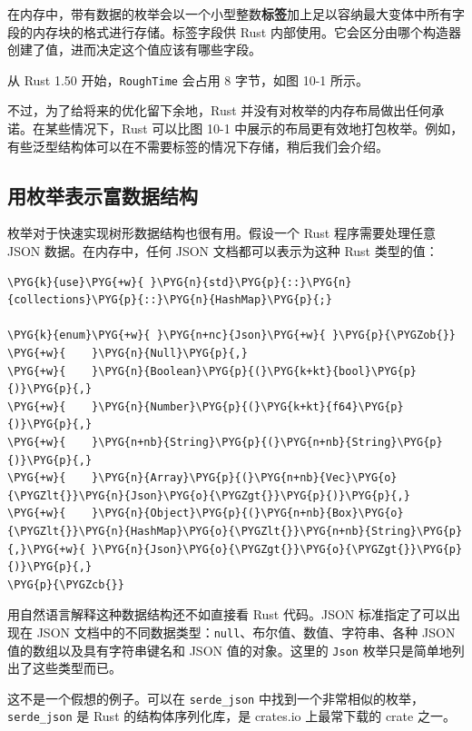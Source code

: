在内存中，带有数据的枚举会以一个小型整数\textbf{标签}加上足以容纳最大变体中所有字段的内存块的格式进行存储。标签字段供 Rust 内部使用。它会区分由哪个构造器创建了值，进而决定这个值应该有哪些字段。

从 Rust 1.50 开始，\texttt{RoughTime} 会占用 8 字节，如图 10-1 所示。


不过，为了给将来的优化留下余地，Rust 并没有对枚举的内存布局做出任何承诺。在某些情况下，Rust 可以比图 10-1 中展示的布局更有效地打包枚举。例如，有些泛型结构体可以在不需要标签的情况下存储，稍后我们会介绍。

\subsection{用枚举表示富数据结构}

枚举对于快速实现树形数据结构也很有用。假设一个 Rust 程序需要处理任意 JSON 数据。在内存中，任何 JSON 文档都可以表示为这种 Rust 类型的值：

\begin{Verbatim}[commandchars=\\\{\},breaklines=true,breakanywhere=true,fontsize=\codefont,xleftmargin=17bp]
\PYG{k}{use}\PYG{+w}{ }\PYG{n}{std}\PYG{p}{::}\PYG{n}{collections}\PYG{p}{::}\PYG{n}{HashMap}\PYG{p}{;}

\PYG{k}{enum}\PYG{+w}{ }\PYG{n+nc}{Json}\PYG{+w}{ }\PYG{p}{\PYGZob{}}
\PYG{+w}{    }\PYG{n}{Null}\PYG{p}{,}
\PYG{+w}{    }\PYG{n}{Boolean}\PYG{p}{(}\PYG{k+kt}{bool}\PYG{p}{)}\PYG{p}{,}
\PYG{+w}{    }\PYG{n}{Number}\PYG{p}{(}\PYG{k+kt}{f64}\PYG{p}{)}\PYG{p}{,}
\PYG{+w}{    }\PYG{n+nb}{String}\PYG{p}{(}\PYG{n+nb}{String}\PYG{p}{)}\PYG{p}{,}
\PYG{+w}{    }\PYG{n}{Array}\PYG{p}{(}\PYG{n+nb}{Vec}\PYG{o}{\PYGZlt{}}\PYG{n}{Json}\PYG{o}{\PYGZgt{}}\PYG{p}{)}\PYG{p}{,}
\PYG{+w}{    }\PYG{n}{Object}\PYG{p}{(}\PYG{n+nb}{Box}\PYG{o}{\PYGZlt{}}\PYG{n}{HashMap}\PYG{o}{\PYGZlt{}}\PYG{n+nb}{String}\PYG{p}{,}\PYG{+w}{ }\PYG{n}{Json}\PYG{o}{\PYGZgt{}}\PYG{o}{\PYGZgt{}}\PYG{p}{)}\PYG{p}{,}
\PYG{p}{\PYGZcb{}}
\end{Verbatim}

用自然语言解释这种数据结构还不如直接看 Rust 代码。JSON 标准指定了可以出现在 JSON 文档中的不同数据类型：\texttt{null}、布尔值、数值、字符串、各种 JSON 值的数组以及具有字符串键名和 JSON 值的对象。这里的 \texttt{Json} 枚举只是简单地列出了这些类型而已。

这不是一个假想的例子。可以在 \texttt{serde\_json} 中找到一个非常相似的枚举，\texttt{serde\_json} 是 Rust 的结构体序列化库，是 crates.io 上最常下载的 crate 之一。


